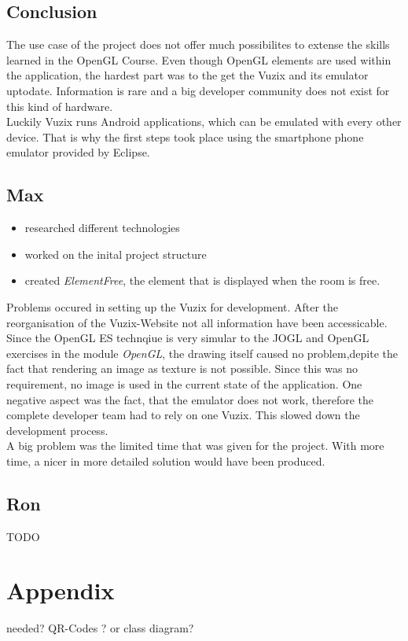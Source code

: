 \documentclass[11pt]{scrartcl}
\begin{document}
\begin{multicols}{2}
	\section{Conclusion}
		The use case of the project does not offer much possibilites to extense the skills learned in the OpenGL Course. Even \linebreak though OpenGL elements are used within the application, the hardest part was to the get the Vuzix and its emulator uptodate. Information is rare and a big developer community does not exist for this kind of hardware. \\
		Luckily Vuzix runs Android applications, which can be emulated with every other device. That is why the first steps took place using the smartphone phone emulator provided by Eclipse. \\
		\subsection{Max}
			\begin{itemize}
				\item researched different technologies
				\item worked on the inital project structure
				\item created \emph{ElementFree}, the element that is displayed when the room is free.
			\end{itemize}
			 Problems occured in setting up the Vuzix for development. After the reorganisation of the Vuzix-Website not all information have been accessicable. \\
			 Since the OpenGL ES technqiue is very simular to the JOGL and OpenGL exercises in the module \emph{OpenGL}, the drawing itself caused no problem,depite the fact that rendering an image as texture is not possible. Since this was no requirement, no image is used in the current state of the application.  One negative aspect was the fact, that the emulator does not work, therefore the complete developer team had to rely on one Vuzix. This slowed down the development process.\\
			 A big problem was the limited time that was given for the project.  With more time, a nicer in more detailed solution would have been produced.
		\subsection{Ron}
			TODO
\end{multicols}

\section*{Appendix}
needed? QR-Codes ? or class diagram?
\end{document}
